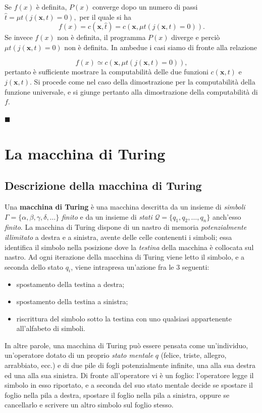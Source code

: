 \documentclass[10pt]{\classname}
\theoremstyle{definition}
\theoremstyle{definition}
\begin{document}
Se $f(x)$ è definita, $P(x)$ converge dopo un numero di passi $\hat t = \mu t \left(j(\bm{x}, t) = 0\right),$ per il quale si ha
\[f(x) = c(\bm{x}, \hat t) = c(\bm{x}, \mu t \left(j(\bm{x}, t) = 0\right)).\] Se invece $f(x)$ non è definita, il programma $P(x)$ diverge e perciò $\mu t \left(j(\bm{x}, t) = 0\right)$ non è definita. In ambedue i casi siamo di fronte alla relazione

\[f(x) \simeq c(\bm{x}, \mu t \left(j(\bm{x}, t) = 0\right)),\] pertanto è sufficiente mostrare la computabilità delle due funzioni $c(\bm{x}, t)$ e $j(\bm x, t)$. Si procede come nel caso della dimostrazione per la computabilità della funzione universale, e si giunge pertanto alla dimostrazione della computabilità di $f$.

\begin{flushright}
$\blacksquare$
\end{flushright}

\chapter{La macchina di Turing}

\section{Descrizione della macchina di Turing}

Una \textbf{macchina di Turing} è una macchina descritta da un insieme di
\emph{simboli} $\Gamma = \{\alpha, \beta, \gamma, \delta, \dots\}$ \emph{finito} e da
un insieme di \emph{stati} $\mathcal{Q} = \{q_1, q_2, \dots, q_n\}$ anch'esso
\emph{finito}. La macchina di Turing dispone di un nastro di memoria
\emph{potenzialmente illimitato} a destra e a sinistra, avente delle celle
contenenti i simboli; essa identifica il simbolo nella posizione dove la
\emph{testina} della macchina è collocata sul nastro. Ad ogni iterazione della
macchina di Turing viene letto il simbolo, e a seconda dello stato $q_i$, viene
intrapresa un'azione fra le $3$ seguenti:
\begin{itemize}
    \item spostamento della testina a destra;
    \item spostamento della testina a sinistra;
    \item riscrittura del simbolo sotto la testina con uno qualsiasi
        appartenente all'alfabeto di simboli.
\end{itemize}

In altre parole, una macchina di Turing può essere pensata come un'individuo, un'operatore dotato di un proprio \emph{stato mentale} $q$ (felice, triste, allegro, arrabbiato, ecc.) e di due pile di fogli potenzialmente infinite, una alla sua destra ed una alla sua sinistra. Di fronte all'operatore vi è un foglio: l'operatore legge il simbolo in esso riportato, e a seconda del suo stato mentale decide se spostare il foglio nella pila a destra, spostare il foglio nella pila a sinistra, oppure se cancellarlo e scrivere un altro simbolo sul foglio stesso.
\end{document}
